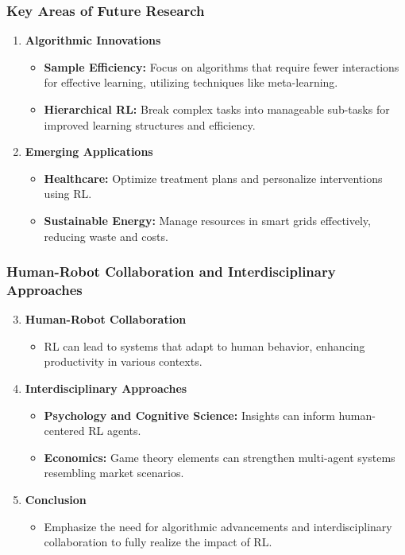 \documentclass[aspectratio=169]{beamer}
\begin{document}
\begin{frame}[fragile]
    \frametitle{Key Areas of Future Research}
    \begin{enumerate}
        \item \textbf{Algorithmic Innovations}
            \begin{itemize}
                \item \textbf{Sample Efficiency:} Focus on algorithms that require fewer interactions for effective learning, utilizing techniques like meta-learning.
                \item \textbf{Hierarchical RL:} Break complex tasks into manageable sub-tasks for improved learning structures and efficiency.
            \end{itemize}
        \item \textbf{Emerging Applications}
            \begin{itemize}
                \item \textbf{Healthcare:} Optimize treatment plans and personalize interventions using RL.
                \item \textbf{Sustainable Energy:} Manage resources in smart grids effectively, reducing waste and costs.
            \end{itemize}
    \end{enumerate}
\end{frame}

\begin{frame}[fragile]
    \frametitle{Human-Robot Collaboration and Interdisciplinary Approaches}
    \begin{enumerate}
        \setcounter{enumi}{2}
        \item \textbf{Human-Robot Collaboration}
            \begin{itemize}
                \item RL can lead to systems that adapt to human behavior, enhancing productivity in various contexts.
            \end{itemize}
        \item \textbf{Interdisciplinary Approaches}
            \begin{itemize}
                \item \textbf{Psychology and Cognitive Science:} Insights can inform human-centered RL agents.
                \item \textbf{Economics:} Game theory elements can strengthen multi-agent systems resembling market scenarios.
            \end{itemize}
        \item \textbf{Conclusion}
            \begin{itemize}
                \item Emphasize the need for algorithmic advancements and interdisciplinary collaboration to fully realize the impact of RL.
            \end{itemize}
    \end{enumerate}
\end{frame}
\end{document}
